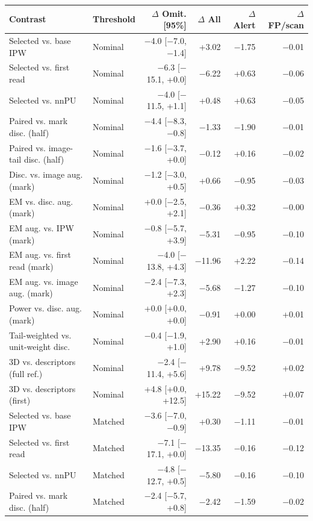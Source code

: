\begin{tabular}{llrrrr}
\toprule
Contrast & Threshold & $\Delta$ Omit. [95\%] & $\Delta$ All & $\Delta$ Alert & $\Delta$ FP/scan \\
\midrule
Selected vs. base IPW & Nominal & $-$4.0 [$-$7.0, $-$1.4] & +3.02 & $-$1.75 & $-$0.01 \\
Selected vs. first read & Nominal & $-$6.3 [$-$15.1, +0.0] & $-$6.22 & +0.63 & $-$0.06 \\
Selected vs. nnPU & Nominal & $-$4.0 [$-$11.5, +1.1] & +0.48 & +0.63 & $-$0.05 \\
Paired vs. mark disc. (half) & Nominal & $-$4.4 [$-$8.3, $-$0.8] & $-$1.33 & $-$1.90 & $-$0.01 \\
Paired vs. image-tail disc. (half) & Nominal & $-$1.6 [$-$3.7, +0.0] & $-$0.12 & +0.16 & $-$0.02 \\
Disc. vs. image aug. (mark) & Nominal & $-$1.2 [$-$3.0, +0.5] & +0.66 & $-$0.95 & $-$0.03 \\
EM vs. disc. aug. (mark) & Nominal & +0.0 [$-$2.5, +2.1] & $-$0.36 & +0.32 & $-$0.00 \\
EM aug. vs. IPW (mark) & Nominal & $-$0.8 [$-$5.7, +3.9] & $-$5.31 & $-$0.95 & $-$0.10 \\
EM aug. vs. first read (mark) & Nominal & $-$4.0 [$-$13.8, +4.3] & $-$11.96 & +2.22 & $-$0.14 \\
EM aug. vs. image aug. (mark) & Nominal & $-$2.4 [$-$7.3, +2.3] & $-$5.68 & $-$1.27 & $-$0.10 \\
Power vs. disc. aug. (mark) & Nominal & +0.0 [+0.0, +0.0] & $-$0.91 & +0.00 & +0.01 \\
Tail-weighted vs. unit-weight disc. & Nominal & $-$0.4 [$-$1.9, +1.0] & +2.90 & +0.16 & $-$0.01 \\
3D vs. descriptors (full ref.) & Nominal & $-$2.4 [$-$11.4, +5.6] & +9.78 & $-$9.52 & +0.02 \\
3D vs. descriptors (first) & Nominal & +4.8 [+0.0, +12.5] & +15.22 & $-$9.52 & +0.07 \\
Selected vs. base IPW & Matched & $-$3.6 [$-$7.0, $-$0.9] & +0.30 & $-$1.11 & $-$0.01 \\
Selected vs. first read & Matched & $-$7.1 [$-$17.1, +0.0] & $-$13.35 & $-$0.16 & $-$0.12 \\
Selected vs. nnPU & Matched & $-$4.8 [$-$12.7, +0.5] & $-$5.80 & $-$0.16 & $-$0.10 \\
Paired vs. mark disc. (half) & Matched & $-$2.4 [$-$5.7, +0.8] & $-$2.42 & $-$1.59 & $-$0.02 \\
\bottomrule
\end{tabular}
